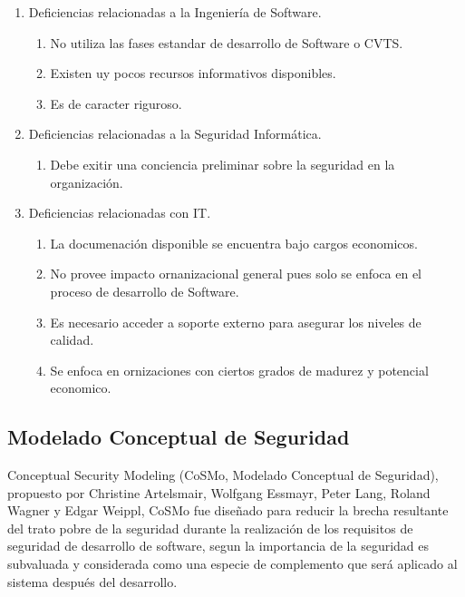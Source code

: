 \documentclass[runningheads,a4paper]{llncs}
\begin{document}
\begin{enumerate}
	\item Deficiencias relacionadas a la Ingeniería de \gls{Software}.
		\begin{enumerate}
			\item No utiliza las fases estandar de desarrollo de \gls{Software} o \gls{CVTS}. 
			\item Existen uy pocos recursos informativos disponibles.
			\item Es de caracter riguroso.\\
			
		\end{enumerate}
	\item Deficiencias relacionadas a la Seguridad Informática.
		\begin{enumerate}
			\item Debe exitir una conciencia preliminar sobre la seguridad en la organización.\\
			
		\end{enumerate}
	\item Deficiencias relacionadas con \gls{IT}.
		\begin{enumerate}
			\item La documenación disponible se encuentra bajo cargos economicos.
			\item No provee impacto ornanizacional general pues solo se enfoca en el proceso de desarrollo de \gls{Software}.
			\item Es necesario acceder a soporte externo para asegurar los niveles de calidad.
			\item Se enfoca en ornizaciones con ciertos grados de madurez y potencial economico.
			
		\end{enumerate}
\end{enumerate}


\subsection{Modelado Conceptual de Seguridad}
Conceptual Security Modeling  (CoSMo, Modelado Conceptual de Seguridad), propuesto por Christine Artelsmair, Wolfgang Essmayr, Peter Lang, Roland Wagner y Edgar Weippl, \gls{CoSMo} fue diseñado para reducir la brecha resultante del trato pobre de la seguridad durante la realización de los requisitos de seguridad de desarrollo de software, segun \cite{CoSMoIntroduction} la importancia de la seguridad es subvaluada y considerada como una especie de complemento que será aplicado al sistema después del desarrollo.
\end{document}
